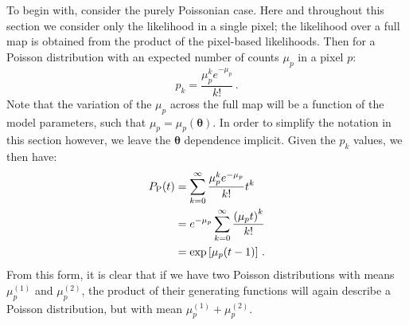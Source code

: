 To begin with, consider the purely Poissonian case. Here and throughout this section we consider only the likelihood in a single pixel; the likelihood over a full map is obtained from the product of the pixel-based likelihoods. Then for a Poisson distribution with an expected number of counts $\mu_p$ in a pixel $p$:
\begin{equation}
p_k = \frac{\mu_p^k e^{-\mu_p}}{k!}\,.
\end{equation}
Note that the variation of the $\mu_p$ across the full map will be a function of the model parameters, such that $\mu_p = \mu_p(\bm{\theta})$. In order to simplify the notation in this section however, we leave the $\bm{\theta}$ dependence implicit. Given the $p_k$ values, we then have:
\begin{equation}\begin{aligned}
P_{\rm P}(t) &= \sum_{k=0}^{\infty} \frac{\mu_p^k e^{-\mu_p}}{k!} t^k \\
&= e^{-\mu_p} \sum_{k=0}^{\infty} \frac{\left( \mu_p t \right)^k}{k!} \\
&= \exp \left[ \mu_p(t-1) \right]\,.
\label{eq:Pgen}
\end{aligned}\end{equation}
From this form, it is clear that if we have two Poisson distributions with means $\mu_p^{(1)}$ and $\mu_p^{(2)}$, the product of their generating functions will again describe a Poisson distribution, but with mean $\mu_p^{(1)} + \mu_p^{(2)}$.

